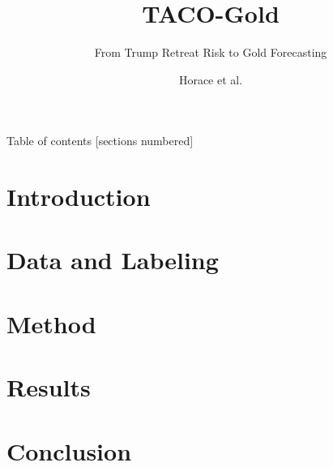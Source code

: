 \documentclass[10pt]{beamer}
\title{TACO-Gold}
\subtitle{From Trump Retreat Risk to Gold Forecasting}
\date{}
\author{Horace et al.}
\institute{Project Presentation}
\begin{document}
\maketitle

\begin{frame}{Table of contents}
  [sections numbered]
  \tableofcontents
\end{frame}

\section{Introduction}




\section{Data and Labeling}





\section{Method}








\section{Results}




\section{Conclusion}


\appendix


\end{document}
